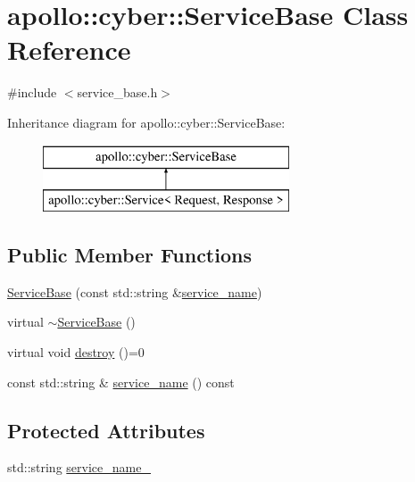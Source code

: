 \hypertarget{classapollo_1_1cyber_1_1ServiceBase}{\section{apollo\-:\-:cyber\-:\-:Service\-Base Class Reference}
\label{classapollo_1_1cyber_1_1ServiceBase}
}


{\ttfamily \#include $<$service\-\_\-base.\-h$>$}

Inheritance diagram for apollo\-:\-:cyber\-:\-:Service\-Base\-:\begin{figure}[H]
\begin{center}
\leavevmode
\includegraphics[height=2.000000cm]{classapollo_1_1cyber_1_1ServiceBase}
\end{center}
\end{figure}
\subsection*{Public Member Functions}
\begin{DoxyCompactItemize}
\item 
\hyperlink{classapollo_1_1cyber_1_1ServiceBase_ae44c71fcd7f69aeae29be17354707122}{Service\-Base} (const std\-::string \&\hyperlink{classapollo_1_1cyber_1_1ServiceBase_af50ffeb173dc4e7b5410af9f74fdfe5b}{service\-\_\-name})
\item 
virtual \hyperlink{classapollo_1_1cyber_1_1ServiceBase_a89e8db9cea8b546c4e8153cd4b5034bc}{$\sim$\-Service\-Base} ()
\item 
virtual void \hyperlink{classapollo_1_1cyber_1_1ServiceBase_ab6587b2517f16bb8133e2ef5518b2243}{destroy} ()=0
\item 
const std\-::string \& \hyperlink{classapollo_1_1cyber_1_1ServiceBase_af50ffeb173dc4e7b5410af9f74fdfe5b}{service\-\_\-name} () const 
\end{DoxyCompactItemize}
\subsection*{Protected Attributes}
\begin{DoxyCompactItemize}
\item 
std\-::string \hyperlink{classapollo_1_1cyber_1_1ServiceBase_a57ba3936b59c0b2b77ad7ef47134477b}{service\-\_\-name\-\_\-}
\end{DoxyCompactItemize}


